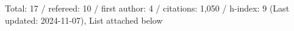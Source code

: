 Total: 17 / refereed: 10 / first author: 4 / citations: 1,050 / h-index: 9 (Last updated: 2024-11-07), List attached below